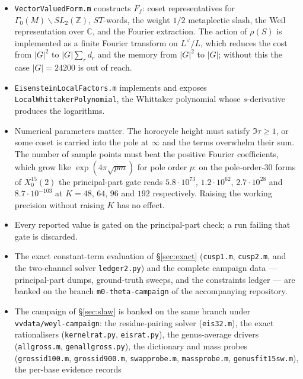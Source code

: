 \documentclass[11pt,reqno]{amsart}
\theoremstyle{plain}
\theoremstyle{definition}
\newcommand{\Z}{\mathbb{Z}}
\newcommand{\C}{\mathbb{C}}
\newcommand{\Ldual}{L^{\vee}}
\begin{document}
\begin{itemize}
\item \texttt{VectorValuedForm.m} constructs $F_f$: coset representatives for
      $\Gamma_0(M)\backslash SL_2(\Z)$, $ST$-words, the weight $1/2$ metaplectic slash, the Weil
      representation over $\C$, and the Fourier extraction. The action of $\rho(S)$ is implemented
      as a finite Fourier transform on $\Ldual/L$, which reduces the cost from $\lvert G\rvert^2$ to
      $\lvert G\rvert\sum_r d_r$ and the memory from $\lvert G\rvert^2$ to $\lvert G\rvert$; without
      this the case $\lvert G\rvert=24200$ is out of reach.
\item \texttt{EisensteinLocalFactors.m} implements \cite[(2.16),(2.17), Props.~5.3, 5.4]{KY} and
      exposes \texttt{LocalWhittakerPolynomial}, the Whittaker polynomial whose $s$-derivative
      produces the logarithms.
\item Numerical parameters matter. The horocycle height must satisfy $\Im\tau\ge1$, or some coset
      is carried into the pole at $\infty$ and the terms overwhelm their sum. The number of sample
      points must beat the positive Fourier coefficients, which grow like $\exp(4\pi\sqrt{pm})$ for
      pole order $p$: on the pole-order-$30$ forms of $X_0^{15}(2)$ the principal-part gate reads
      $5.8\cdot10^{73}$, $1.2\cdot10^{62}$, $2.7\cdot10^{28}$ and $8.7\cdot10^{-103}$ at $K=48$,
      $64$, $96$ and $192$ respectively. Raising the working precision without raising $K$ has no
      effect.
\item Every reported value is gated on the principal-part check; a run failing that gate is
      discarded.
\item The exact constant-term evaluation of \S\ref{sec:exact} (\texttt{cusp1.m},
      \texttt{cusp2.m}, and the two-channel solver \texttt{ledger2.py}) and the complete
      campaign data --- principal-part dumps, ground-truth sweeps, and the constraints ledger
      --- are banked on the branch \texttt{m0-theta-campaign} of the accompanying repository.
\item The campaign of \S\ref{sec:slaw} is banked on the same branch under
      \texttt{vvdata/weyl-campaign}: the residue-pairing solver (\texttt{eis32.m}), the exact
      rationalisers (\texttt{kernelrat.py}, \texttt{eisrat.py}), the genus-average drivers
      (\texttt{allgross.m}, \texttt{genallgross.py}), the dictionary and mass probes
      (\texttt{grossid100.m}, \texttt{grossid900.m}, \texttt{swapprobe.m},
      \texttt{massprobe.m}, \texttt{genusfit15sw.m}), the per-base evidence records

\end{itemize}
\end{document}
